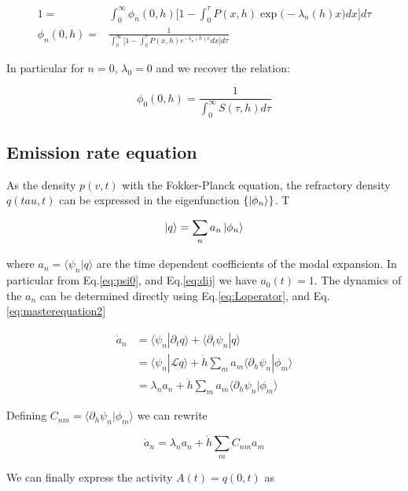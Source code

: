 \documentclass[a4paper,11pt,twoside]{article}
\numberwithin{equation}{section}
\begin{document}
\begin{align}
1=&\int_0^{\infty}\phi_n(0,h)\big[1-\int^\tau_0 P(x,h) \exp\big(-\lambda_n(h)x)dx\big]d\tau \\
\phi_n(0,h) =&\frac{1}{\int_0^{\infty}\big[1-\int^\tau_0 P(x,h) e^{-\lambda_n(h)x}dx\big]d\tau}
\end{align}


In particular for $n=0$, $\lambda_0=0$ and we recover the relation:

\begin{equation}
\phi_0(0,h) = \frac{1}{\int_0^{\infty}S(\tau,h)d\tau}
\end{equation}

\subsection{Emission rate equation}

As the density $p(v,t)$ with the Fokker-Planck equation, the refractory density $q(tau,t)$ can be expressed in the eigenfunction  $ \{\ket{\phi_n}\}$. T

\begin{equation}
\label{eq:q}
\ket{q}=\sum_na_n\ket{\phi_n}
\end{equation}

where $a_n=\langle \psi_n | q\rangle$ are the time dependent coefficients of the modal expansion. In particular from Eq.\eqref{eq:psi0}, and Eq.\eqref{eq:dij} we have $a_0(t)=1$. The dynamics of the $a_n$ can be determined directly using Eq.\eqref{eq:Loperator}, and Eq.\eqref{eq:masterequation2}

\begin{align}
\dot{a}_n&=\langle\psi_n|\partial_t q\rangle+\langle\partial_t\psi_n|q\rangle \nonumber \\
&=\langle\psi_n|\mathcal{L}q\rangle+  \dot{h}\sum_ma_m\langle\partial_h\psi_n|\phi_m \rangle \nonumber \\
&=\lambda_n a_n +  \dot{h}\sum_ma_m\langle\partial_h\psi_n|\phi_m \rangle 
\end{align}

Defining $C_{nm}=\langle\partial_h\psi_n|\phi_m \rangle $ we can rewrite

\begin{equation}
\dot{a}_n=\lambda_n a_n +  \dot{h}\sum_mC_{nm}a_m 
\end{equation}



We can finally express the activity $A(t)=q(0,t)$ as
\end{document}
